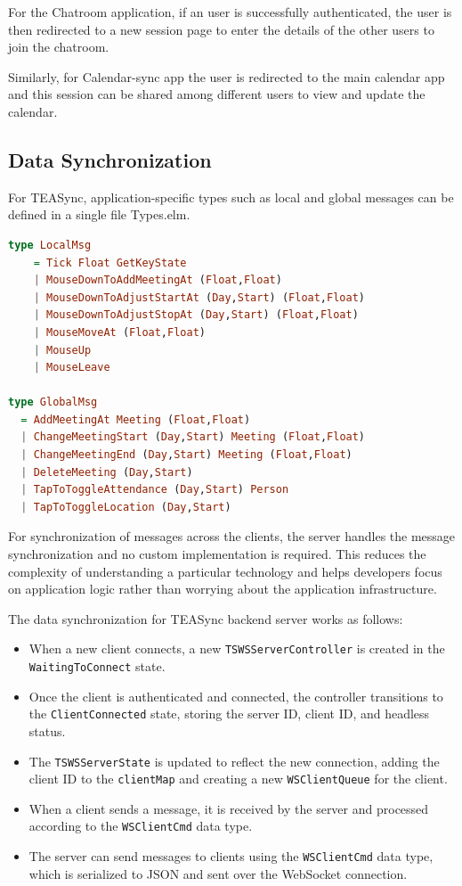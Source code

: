 For the Chatroom application, if an user is successfully authenticated, the user is then redirected to a new session page to enter the details of the other users to join the chatroom.

Similarly, for Calendar-sync app the user is redirected to the main calendar app and this session can be shared among different users to view and update the calendar.

\subsection{Data Synchronization}

For TEASync, application-specific types such as local and global messages can be defined in a single file Types.elm. 

\begin{lstlisting}[language=Haskell, caption=Local and Global messages in Types.elm, label=lst:haskell, mathescape=true]
type LocalMsg 
    = Tick Float GetKeyState
    | MouseDownToAddMeetingAt (Float,Float)
    | MouseDownToAdjustStartAt (Day,Start) (Float,Float)
    | MouseDownToAdjustStopAt (Day,Start) (Float,Float)
    | MouseMoveAt (Float,Float)
    | MouseUp
    | MouseLeave

type GlobalMsg
  = AddMeetingAt Meeting (Float,Float)
  | ChangeMeetingStart (Day,Start) Meeting (Float,Float) 
  | ChangeMeetingEnd (Day,Start) Meeting (Float,Float)
  | DeleteMeeting (Day,Start)
  | TapToToggleAttendance (Day,Start) Person
  | TapToToggleLocation (Day,Start)

\end{lstlisting}


For synchronization of messages across the clients, the server handles the message synchronization and no custom implementation is required. This reduces the complexity of understanding a particular technology and helps developers focus on application logic rather than worrying about the application infrastructure.

The data synchronization for TEASync backend server works as follows:
\begin{itemize}
    \item When a new client connects, a new \lstinline{TSWSServerController} is created in the \lstinline{WaitingToConnect} state.
    \item Once the client is authenticated and connected, the controller transitions to the \lstinline{ClientConnected} state, storing the server ID, client ID, and headless status.
    \item The \lstinline{TSWSServerState} is updated to reflect the new connection, adding the client ID to the \lstinline{clientMap} and creating a new \lstinline{WSClientQueue} for the client.
    \item When a client sends a message, it is received by the server and processed according to the \lstinline{WSClientCmd} data type.
    \item The server can send messages to clients using the \lstinline{WSClientCmd} data type, which is serialized to JSON and sent over the WebSocket connection.
\end{itemize}

